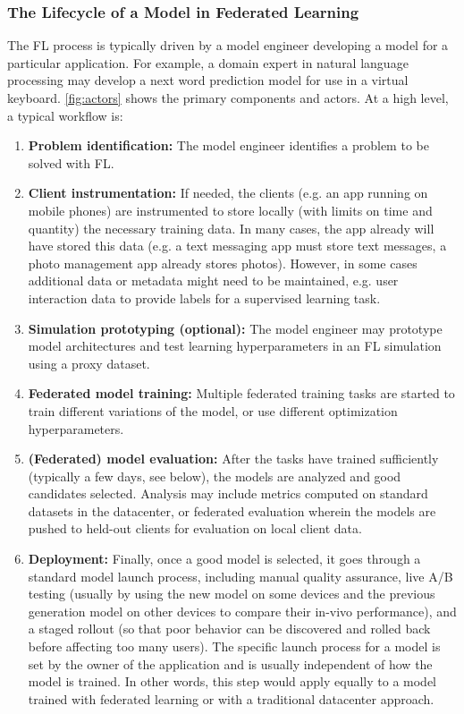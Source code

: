 \subsubsection{The Lifecycle of a Model in Federated Learning}\label{sec:lifecycle}
The FL process is typically driven by a model engineer developing a model for a particular application. For example, a domain expert in natural language processing may develop a next word prediction model for use in a virtual keyboard. \cref{fig:actors} shows the primary components and actors. At a high level, a typical workflow is:

\begin{enumerate}

\item \textbf{Problem identification:} The model engineer identifies a problem to be solved with FL.

\item \textbf{Client instrumentation:} If needed, the clients (e.g. an app running on mobile phones) are instrumented to store locally (with limits on time and quantity) the necessary training data. In many cases, the app already will have stored this data (e.g. a text messaging app must store text messages, a photo management app already stores photos). However, in some cases additional data or metadata might need to be maintained, e.g. user interaction data to provide labels for a supervised learning task.

\item \textbf{Simulation prototyping (optional):} The model engineer may prototype model architectures and test learning hyperparameters in an FL simulation using a proxy dataset.

\item \textbf{Federated model training: } Multiple federated training tasks are started to train different variations of the model, or use different optimization hyperparameters. \label{step:fl-train}

\item \textbf{ (Federated) model evaluation:} After the tasks have trained sufficiently (typically a few days, see below), the models are analyzed and good candidates selected. Analysis may include metrics computed on standard datasets in the datacenter, or federated evaluation wherein the models are pushed to held-out clients for evaluation on local client data.

\item \textbf{Deployment:} Finally, once a good model is selected, it goes through a standard model launch process, including manual quality assurance, live A/B testing (usually by using the new model on some devices and the previous generation model on other devices to compare their in-vivo performance), and a staged rollout (so that poor behavior can be discovered and rolled back before affecting too many users). The specific launch process for a model is set by the owner of the application and is usually independent of how the model is trained. In other words, this step would apply equally to a model trained with federated learning or with a traditional datacenter approach.\label{step:deploy}

\end{enumerate}

